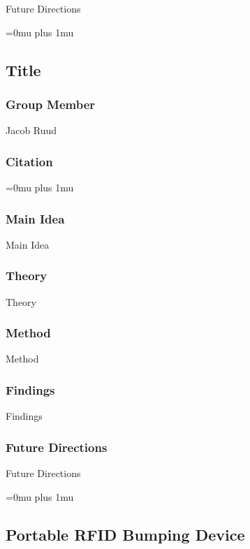 \noindent
Future Directions 

\Urlmuskip=0mu plus 1mu\relax

\noindent
\subsection{Title}

\subsubsection{Group Member}

\noindent
Jacob Ruud

\noindent
\subsubsection{Citation}

\Urlmuskip=0mu plus 1mu\relax

\subsubsection{Main Idea}

\noindent
Main Idea

\subsubsection{Theory}

\noindent
Theory

\subsubsection{Method}

\noindent
Method

\subsubsection{Findings}

\noindent
Findings

\subsubsection{Future Directions}

\noindent
Future Directions 

\Urlmuskip=0mu plus 1mu\relax

\noindent
\subsection{Portable RFID Bumping Device}

